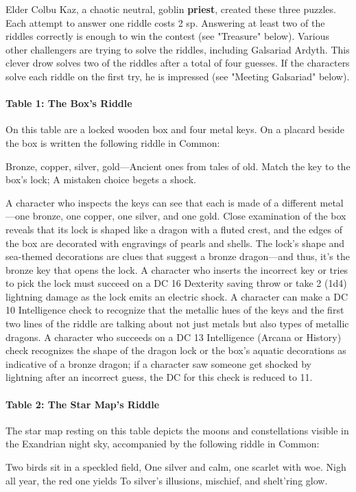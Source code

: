 \documentclass[10pt,a4,twoside,twocolumn,openany,nodeprecatedcode]{dndbook}
\begin{document}
Elder Colbu Kaz, a chaotic neutral, goblin \textbf{priest}, created these three puzzles. Each attempt to answer one riddle costs 2 sp. Answering at least two of the riddles correctly is enough to win the contest (see "Treasure" below). Various other challengers are trying to solve the riddles, including Galsariad Ardyth. This clever drow solves two of the riddles after a total of four guesses. If the characters solve each riddle on the first try, he is impressed (see "Meeting Galsariad" below).
\paragraph{Table 1: The Box's Riddle}
On this table are a locked wooden box and four metal keys. On a placard beside the box is written the following riddle in Common:
\begin{DndReadAloud}{}
Bronze, copper, silver, gold—Ancient ones from tales of old. Match the key to the box's lock; A mistaken choice begets a shock.
\end{DndReadAloud}

A character who inspects the keys can see that each is made of a different metal—one bronze, one copper, one silver, and one gold. Close examination of the box reveals that its lock is shaped like a dragon with a fluted crest, and the edges of the box are decorated with engravings of pearls and shells.
The lock's shape and sea-themed decorations are clues that suggest a bronze dragon—and thus, it's the bronze key that opens the lock. A character who inserts the incorrect key or tries to pick the lock must succeed on a DC 16 Dexterity saving throw or take 2 (1d4) lightning damage as the lock emits an electric shock.
A character can make a DC 10 Intelligence check to recognize that the metallic hues of the keys and the first two lines of the riddle are talking about not just metals but also types of metallic dragons. A character who succeeds on a DC 13 Intelligence (Arcana or History) check recognizes the shape of the dragon lock or the box's aquatic decorations as indicative of a bronze dragon; if a character saw someone get shocked by lightning after an incorrect guess, the DC for this check is reduced to 11.
\paragraph{Table 2: The Star Map's Riddle}
The star map resting on this table depicts the moons and constellations visible in the Exandrian night sky, accompanied by the following riddle in Common:
\begin{DndReadAloud}{}
Two birds sit in a speckled field, One silver and calm, one scarlet with woe. Nigh all year, the red one yields To silver's illusions, mischief, and shelt'ring glow.
\end{DndReadAloud}
\end{document}
